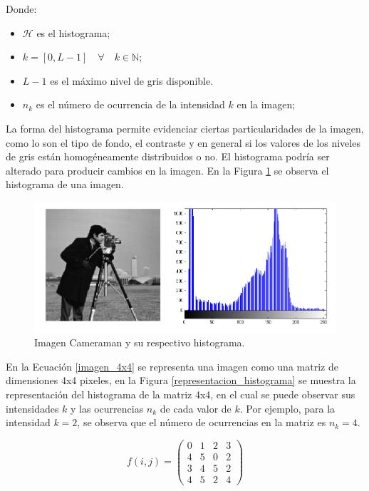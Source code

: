 Donde:
\begin{itemize} 
    \item $\mathcal{H}$ es el histograma;
    \item $k = [0, L-1] \quad \forall \quad k \in \mathbb{N}$;
    \item $L-1$ es el máximo nivel de gris disponible. 
    \item $n_k$ es el número de ocurrencia de la intensidad $k$ en la imagen;
\end{itemize}

La forma del histograma permite evidenciar ciertas particularidades de la imagen, como lo son el tipo de fondo, el contraste y en general si los valores de los niveles de gris están homogéneamente distribuidos o no. El histograma podría ser alterado para producir cambios en la imagen. En la Figura \ref{cameraman-histograma} se observa el histograma de una imagen.

\begin{figure}[H]
    \includegraphics[width=14cm]{cameraman-histograma.png}
    \caption{Imagen Cameraman y su respectivo histograma.}
    \label{cameraman-histograma}
\end{figure}

En la Ecuación \ref{imagen_4x4} se representa una imagen como una matriz de dimensiones 4x4 pixeles, en la Figura \ref{representacion_histograma} se muestra la representación del histograma de la matriz 4x4, en el cual se puede observar sus intensidades $k$ y las ocurrencias $n_k$ de cada valor de $k$. Por ejemplo, para la intensidad $k=2$, se observa que el número de ocurrencias en la matriz es $n_k=4$.

\begin{equation}
f(i,j) = 
\begin{pmatrix} 0 & 1 & 2 & 3 
\\4 & 5 & 0 & 2 
\\3 & 4 & 5 & 2 
\\4 & 5 & 2 & 4
\end{pmatrix} 
\label{imagen_4x4}
\end{equation}

